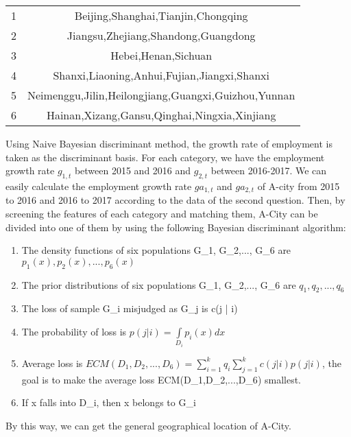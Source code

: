 \documentclass{mcmthesis}
\begin{document}
\begin{center}
	\begin{tabular}{cc}
		\hline
		\makebox[0.3\textwidth][c]{class}	&  \makebox[0.4\textwidth][c]{city} \\ \hline
		1      & Beijing,Shanghai,Tianjin,Chongqing        \\ \hline
		2	   & Jiangsu,Zhejiang,Shandong,Guangdong		\\ \hline
		3	   & Hebei,Henan,Sichuan      \\ \hline
		4	   & Shanxi,Liaoning,Anhui,Fujian,Jiangxi,Shanxi \\ \hline
		5	   & Neimenggu,Jilin,Heilongjiang,Guangxi,Guizhou,Yunnan \\ \hline
		6      & Hainan,Xizang,Gansu,Qinghai,Ningxia,Xinjiang  \\ \hline
	
	\end{tabular}
\end{center}
Using Naive Bayesian discriminant method, the growth rate of employment is taken as the discriminant basis. For each category, we have the employment growth rate $g_{1,t}$ between 2015 and 2016 and $g_{2,t}$ between 2016-2017. We can easily calculate the employment growth rate $ga_{1,t}$ and $ga_{2,t}$ of A-city from 2015 to 2016 and 2016 to 2017 according to the data of the second question. Then, by screening the features of each category and matching them, A-City can be divided into one of them by using the following Bayesian discriminant algorithm:
\begin{enumerate}
	\item The density functions of six populations G\_1, G\_2,..., G\_6 are $p_1(x),p_2(x),...,p_6(x)$
	\item The prior distributions of six populations G\_1, G\_2,..., G\_6 are $q_1,q_2,...,q_6$
	\item The loss of sample G\_i misjudged as G\_j is c(j | i)
	\item The probability of loss is $p(j|i) = \int\limits_{{D_i}} {{p_i}(x)dx} $
	\item Average loss is $ECM({D_1},{D_2},...,{D_6}) = \sum\limits_{i = 1}^k {{q_i}} \sum\limits_{j = 1}^k {c(j|i)p(j|i)} $, the goal is to make the average loss ECM({D\_1},{D\_2},...,{D\_6}) smallest.
	\item If x falls into D\_i, then x belongs to G\_i
\end{enumerate}
By this way, we can get the general geographical location of A-City.
\end{document}
